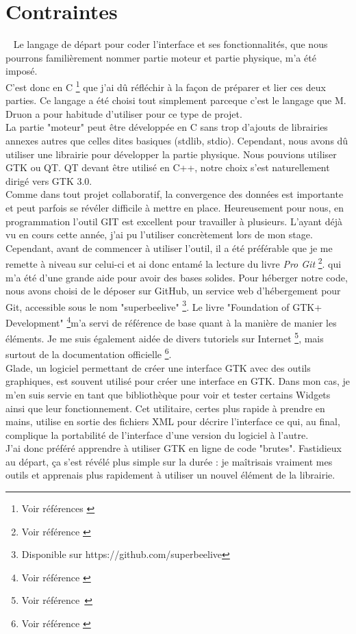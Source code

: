 \documentclass[11pt,french,a4paper]{report}
\begin{document}
    \section{Contraintes} 
Le langage de départ pour coder l'interface et ses fonctionnalités, que nous pourrons familièrement nommer partie moteur 
et partie physique, m'a été imposé. \\
C'est donc en C \footnote{Voir références \cite{ref5} \cite{ref8}} que j'ai dû réfléchir à la façon de préparer et lier ces deux parties. Ce langage a été choisi tout simplement 
parceque c'est  le langage que M. Druon a pour habitude d'utiliser pour ce type de projet. \\
La partie "moteur" peut être développée en C sans trop d'ajouts de librairies annexes autres que celles dites basiques 
(stdlib, stdio). 
Cependant, nous avons dû utiliser une librairie pour développer la partie physique. Nous pouvions utiliser GTK ou QT. 
QT devant être utilisé en C++, notre choix s'est naturellement dirigé vers GTK 3.0. \\

Comme dans tout projet collaboratif, la convergence des données est importante et peut parfois se révéler difficile à mettre en place. 
Heureusement pour nous, en programmation l'outil GIT est excellent pour travailler à plusieurs. L'ayant déjà vu en cours cette année,
j'ai pu l'utiliser concrètement lors de mon stage. Cependant, avant de commencer à utiliser l'outil, il a été préférable que 
je me remette à niveau sur celui-ci et ai donc entamé la lecture du livre \textit{Pro Git} \footnote{Voir référence \cite{ref7}}. 
qui m'a été d'une grande aide pour avoir des bases solides. Pour héberger notre code, nous avons choisi de le déposer sur GitHub,
un service web d'hébergement pour Git, accessible sous le nom "superbeelive" \footnote{Disponible sur https://github.com/superbeelive}.
Le livre "Foundation of GTK+ Development" \footnote{Voir référence \cite{ref1}}m'a servi de référence de base quant à la manière de manier les éléments. 
Je me suis également aidée de divers tutoriels sur Internet \footnote{Voir référence \cite{ref3}}, mais surtout de la documentation officielle \footnote{Voir référence \cite{ref2}}. 
\\

Glade, un logiciel permettant de créer une interface GTK avec des outils graphiques, est souvent utilisé pour créer une interface
en GTK.
Dans mon cas, je m'en suis servie en tant que bibliothèque pour voir et tester certains Widgets ainsi que leur fonctionnement.
Cet utilitaire, certes plus rapide à prendre en mains, utilise en sortie des fichiers XML pour décrire l'interface ce qui, 
au final, complique la portabilité de l'interface d'une version du logiciel à l'autre. \\ 
J'ai donc préféré apprendre à utiliser GTK en ligne de code "brutes". Fastidieux au départ, 
ça s'est révélé plus simple sur la durée : je maîtrisais vraiment mes outils et apprenais plus rapidement à utiliser 
un nouvel élément de la librairie.  
\end{document}
